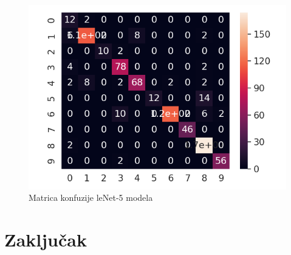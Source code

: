 \documentclass[a4paper]{article}
\begin{document}
\begin{figure}[h!]
\begin{center}
\includegraphics[scale=0.6]{confussion_matrix_1.png}
\end{center}
\caption{Matrica konfuzije leNet-5 modela}
\label{fig:confussion_matrix_1}
\end{figure}


\newpage

\section{Zaključak}
\label{sec:zakljucak}

\newpage

\appendix
 


\newpage

\appendix
\end{document}

